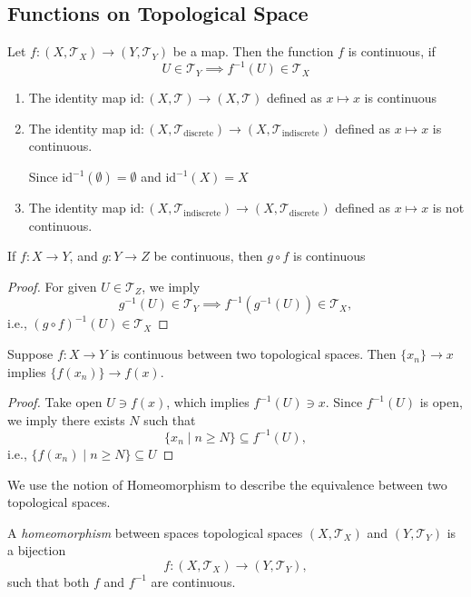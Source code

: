 \subsection{Functions on Topological Space}
\begin{definition}[Continuous]
Let $f:(X,\mathcal{T}_X)\to(Y,\mathcal{T}_Y)$ be a map. Then the function $f$ is continuous, if
\[
U\in\mathcal{T}_Y\implies
f^{-1}(U)\in\mathcal{T}_X
\]
\end{definition}
\begin{example}
\begin{enumerate}
\item
The identity map $\text{id}: (X,\mathcal{T})\to(X,\mathcal{T})$ defined as 
$x\mapsto x$ is continuous
\item
The identity map $\text{id}: (X,\mathcal{T}_{\text{discrete}})\to(X,\mathcal{T}_{\text{indiscrete}})$ defined as $x\mapsto x$ is continuous.

Since $\text{id}^{-1}(\emptyset)=\emptyset$ and $\text{id}^{-1}(X)=X$
\item
The identity map $\text{id}: (X,\mathcal{T}_{\text{indiscrete}})\to(X,\mathcal{T}_{\text{discrete}})$ defined as $x\mapsto x$ is not continuous.
\end{enumerate}
\end{example}

\begin{proposition}
If $f:X\to Y$, and $g:Y\to Z$ be continuous, then $g\circ f$ is continuous
\end{proposition}

\begin{proof}
For given $U\in\mathcal{T}_Z$, we imply
\[
g^{-1}(U)\in\mathcal{T}_Y
\implies
f^{-1}(g^{-1}(U))\in\mathcal{T}_X,
\]
i.e., $(g\circ f)^{-1}(U)\in\mathcal{T}_X$
\end{proof}

\begin{proposition}
Suppose $f:X\to Y$ is continuous between two topological spaces. Then $\{x_n\}\to x$ implies $\{f(x_n)\}\to f(x)$.
\end{proposition}
\begin{proof}
Take open $U\ni f(x)$, which implies $f^{-1}(U)\ni x$. Since $f^{-1}(U)$ is open, we imply there exists $N$ such that 
\[
\{x_n\mid n\ge N\}\subseteq f^{-1}(U),
\] 
i.e., $\{f(x_n)\mid n\ge N\}\subseteq U$
\end{proof}

We use the notion of Homeomorphism to describe the equivalence between two topological spaces.
\begin{definition}[Homeomorphism]
A \emph{homeomorphism} between spaces topological spaces $(X,\mathcal{T}_X)$ and $(Y,\mathcal{T}_Y)$ is a bijection 
\[
f:(X,\mathcal{T}_X)\to(Y,\mathcal{T}_Y),
\]
such that both $f$ and $f^{-1}$ are continuous.
\end{definition}

